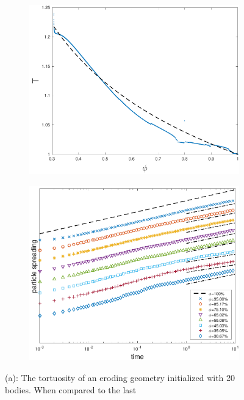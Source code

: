 \documentclass[preprint,10pt]{elsarticle}
\begin{document}
\begin{figure}[H]
\begin{subfigure}[b]{0.5\textwidth}
\includegraphics*[height = 0.8\linewidth]{./figs/tort_eulerian20b}
\caption{}
\end{subfigure}
\begin{subfigure}[b]{0.5\textwidth}
\includegraphics*[height=0.8\linewidth]{./figs/20b_dense_second_moment_ref}
\caption{}
\end{subfigure}
\caption{\label{fig:ErodingLow20Transport} (a): The tortuosity of an
eroding geometry initialized with 20 bodies.  When compared to the last
}
\end{figure}
\end{document}
